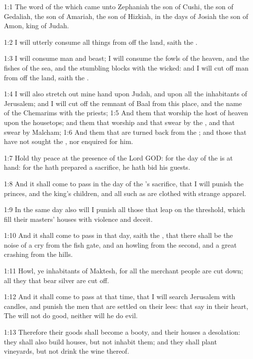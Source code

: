 

1:1 The word of the \LORD which came unto Zephaniah the son of Cushi, the son of Gedaliah, the son of Amariah, the son of Hizkiah, in the days of Josiah the son of Amon, king of Judah.

1:2 I will utterly consume all things from off the land, saith the \LORD.

1:3 I will consume man and beast; I will consume the fowls of the heaven, and the fishes of the sea, and the stumbling blocks with the wicked: and I will cut off man from off the land, saith the \LORD.

1:4 I will also stretch out mine hand upon Judah, and upon all the inhabitants of Jerusalem; and I will cut off the remnant of Baal from this place, and the name of the Chemarims with the priests; 1:5 And them that worship the host of heaven upon the housetops; and them that worship and that swear by the \LORD, and that swear by Malcham; 1:6 And them that are turned back from the \LORD; and those that have not sought the \LORD, nor enquired for him.

1:7 Hold thy peace at the presence of the Lord GOD: for the day of the \LORD is at hand: for the \LORD hath prepared a sacrifice, he hath bid his guests.

1:8 And it shall come to pass in the day of the \LORD's sacrifice, that I will punish the princes, and the king's children, and all such as are clothed with strange apparel.

1:9 In the same day also will I punish all those that leap on the threshold, which fill their masters' houses with violence and deceit.

1:10 And it shall come to pass in that day, saith the \LORD, that there shall be the noise of a cry from the fish gate, and an howling from the second, and a great crashing from the hills.

1:11 Howl, ye inhabitants of Maktesh, for all the merchant people are cut down; all they that bear silver are cut off.

1:12 And it shall come to pass at that time, that I will search Jerusalem with candles, and punish the men that are settled on their lees: that say in their heart, The \LORD will not do good, neither will he do evil.

1:13 Therefore their goods shall become a booty, and their houses a desolation: they shall also build houses, but not inhabit them; and they shall plant vineyards, but not drink the wine thereof.

